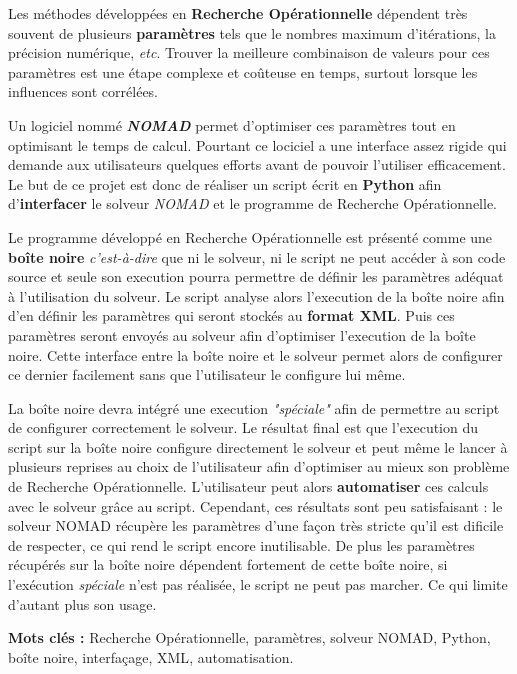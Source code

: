 Les méthodes développées en \textbf{Recherche Opérationnelle} dépendent très souvent de plusieurs \textbf{paramètres} tels que le nombres maximum d'itérations, la précision numérique, \textit{etc}. Trouver la meilleure combinaison de valeurs pour ces paramètres est une étape complexe et coûteuse en temps, surtout lorsque les influences sont corrélées. 

Un logiciel nommé \textit{\textbf{\gls{NOMAD}}} permet d'optimiser ces paramètres tout en optimisant le temps de calcul. Pourtant ce lociciel a une interface assez rigide qui demande aux utilisateurs quelques efforts avant de pouvoir l'utiliser efficacement. Le but de ce projet est donc de réaliser un script écrit en \textbf{Python} afin d'\textbf{interfacer} le solveur \textit{\gls{NOMAD}} et le programme de Recherche Opérationnelle.

Le programme développé en Recherche Opérationnelle est présenté comme une \textbf{boîte noire} \textit{c'est-à-dire} que ni le solveur, ni le script ne peut accéder à son code source et seule son execution pourra permettre de définir les paramètres adéquat à l'utilisation du solveur. Le script analyse alors l'execution de la boîte noire afin d'en définir les paramètres qui seront stockés au \textbf{format \gls{XML}}. Puis ces paramètres seront envoyés au solveur afin d'optimiser l'execution de la boîte noire. Cette interface entre la boîte noire et le solveur permet alors de configurer ce dernier facilement sans que l'utilisateur le configure lui même.

La boîte noire devra intégré une execution \textit{"spéciale"} afin de permettre au script de configurer correctement le solveur. Le résultat final est que l'execution du script sur la boîte noire configure directement le solveur et peut même le lancer à plusieurs reprises au choix de l'utilisateur afin d'optimiser au mieux son problème de Recherche Opérationnelle. L'utilisateur peut alors \textbf{automatiser} ces calculs avec le solveur grâce au script. Cependant, ces résultats sont peu satisfaisant : le solveur \gls{NOMAD} récupère les paramètres d'une façon très stricte qu'il est dificile de respecter, ce qui rend le script encore inutilisable. De plus les paramètres récupérés sur la boîte noire dépendent fortement de cette boîte noire, si l'exécution \textit{spéciale} n'est pas réalisée, le script ne peut pas marcher. Ce qui limite d'autant plus son usage.  

\vskip40mm

\textbf{Mots clés :} Recherche Opérationnelle, paramètres, solveur \gls{NOMAD}, Python, boîte noire, interfaçage, \gls{XML}, automatisation.